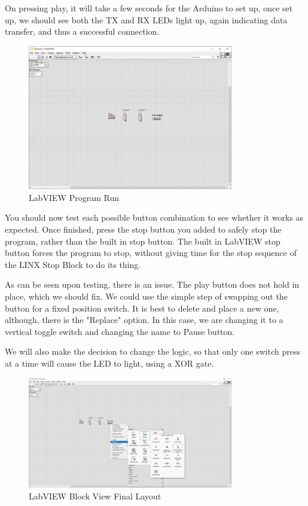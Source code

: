 \documentclass[a4paper,11pt]{report}
\begin{document}
On pressing play, it will take a few seconds for the Arduino to set up, once set up, we should see both the TX and RX LEDs light up, again indicating data transfer, and thus a successful connection.

\begin{figure}[H]
\centering
\includegraphics[width=0.8\textwidth]{screenshots/labview30}
\caption{LabVIEW Program Run}
\end{figure}

You should now test each possible button combination to see whether it works as expected. Once finished, press the stop button you added to safely stop the program, rather than the built in stop button. The built in LabVIEW stop button forces the program to stop, without giving time for the stop sequence of the LINX Stop Block to do its thing.

As can be seen upon testing, there is an issue. The play button does not hold in place, which we should fix. We could use the simple step of swapping out the button for a fixed position switch. It is best to delete and place a new one, although, there is the "Replace" option. In this case, we are changing it to a vertical toggle switch and changing the name to Pause button.

We will also make the decision to change the logic, so that only one switch press at a time will cause the LED to light, using a XOR gate.

\begin{figure}[H]
\centering
\includegraphics[width=0.8\textwidth]{screenshots/labview31}
\caption{LabVIEW Block View Final Layout}
\end{figure}
\end{document}

